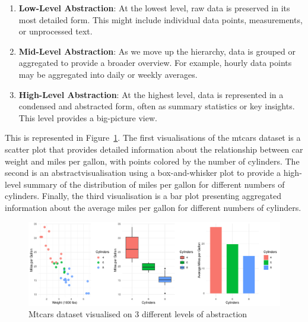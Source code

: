 \documentclass{article}\usepackage[]{graphicx}\usepackage[]{xcolor}
\makeatletter
\def\maxwidth{ %
  \ifdim\Gin@nat@width>\linewidth
    \linewidth
  \else
    \Gin@nat@width
  \fi
}
\newenvironment{knitrout}{}{} %
\makeatother
\begin{document}
\begin{enumerate}
    \item \textbf{Low-Level Abstraction}: At the lowest level, raw data is preserved in its most detailed form. This might include individual data points, measurements, or unprocessed text.
    \item \textbf{Mid-Level Abstraction}: As we move up the hierarchy, data is grouped or aggregated to provide a broader overview. For example, hourly data points may be aggregated into daily or weekly averages.
    \item \textbf{High-Level Abstraction}: At the highest level, data is represented in a condensed and abstracted form, often as summary statistics or key insights. This level provides a big-picture view.
\end{enumerate}

\noindent
This is represented in Figure~\ref{fig:abs-plots}. The first visualisations of the mtcars dataset is a scatter plot that provides detailed information about the relationship between car weight and miles per gallon, with points colored by the number of cylinders. The second is an abstractvisualisation using a box-and-whisker plot to provide a high-level summary of the distribution of miles per gallon for different numbers of cylinders. Finally, the third visualisation is a bar plot presenting aggregated information about the average miles per gallon for different numbers of cylinders.

\begin{knitrout}\scriptsize
{}\color{fgcolor}\begin{figure}[H]

{\centering \includegraphics[width=\maxwidth]{figure/beamer-abs-plots-1} 

}

\caption[Mtcars dataset visualised on 3 different levels of abstraction]{Mtcars dataset visualised on 3 different levels of abstraction}\label{fig:abs-plots}
\end{figure}

\end{knitrout}
\end{document}
